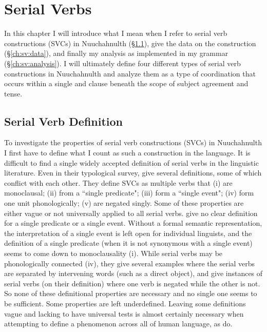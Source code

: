\chapter{Serial Verbs} \label{ch:sv}

In this chapter I will introduce what I mean when I refer to serial verb constructions (SVCs) in Nuuchahnulth (\S\ref{ch:sv:def}), give the data on the construction (\S\ref{ch:sv:data}), and finally my analysis as implemented in my grammar (\S\ref{ch:sv:analysis}). I will ultimately define four different types of serial verb constructions in Nuuchahnulth and analyze them as a type of coordination that occurs within a single and clause beneath the scope of subject agreement and tense.

\section{Serial Verb Definition} \label{ch:sv:def}

To investigate the properties of serial verb constructions (SVCs) in Nuuchahnulth I first have to define what I count as such a construction in the language.  It is difficult to find a single widely accepted definition of serial verbs in the linguistic literature. Even in their typological survey, \cite{aikhenvalddixon2006} give several definitions, some of which conflict with each other. They define SVCs as multiple verbs that (i) are monoclausal; (ii) from a ``single predicate"; (iii) form a ``single event"; (iv) form one unit phonologically; (v) are negated singly. Some of these properties are either vague or not universally applied to all serial verbs. \citeauthor{aikhenvalddixon2006} give no clear definition for a single predicate or a single event. Without a formal semantic representation, the interpretation of a single event is left open for individual linguists, and the definition of a single predicate (when it is not synonymous with a single event) seems to come down to monoclausality (i). While serial verbs may be phonologically connected (iv), they give several examples where the serial verbs are separated by intervening words (such as a direct object), and give instances of serial verbs (on their definition) where one verb is negated while the other is not. So none of these definitional properties are necessary and no single one seems to be sufficient. Some properties are left underdefined. Leaving some definitions vague and lacking to have universal tests is almost certainly necessary when attempting to define a phenomenon across all of human language, as \citeauthor{aikhenvalddixon2006} do.

